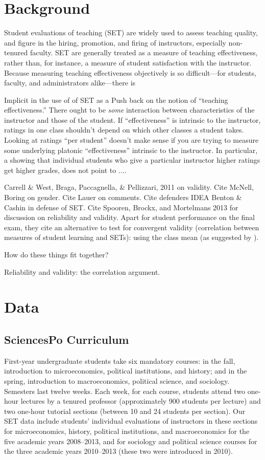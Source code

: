 \documentclass[12pt]{article}
\newcommand{\todo}[1]{{\color{red}{TO DO: \sc #1}}}
\begin{document}
\section{Background}
Student evaluations of teaching (SET) are widely used to assess teaching quality,
and figure in the hiring, promotion, and firing of instructors, especially non-tenured faculty.
SET are generally treated as a measure of teaching effectiveness, rather than, for
instance, a measure of student satisfaction with the instructor.
Because measuring teaching effectiveness objectively is so difficult---for students,
faculty, and administrators alike---there is 

Implicit in the use of of SET as a 
Push back on the notion of ``teaching effectiveness.''
There ought to be \emph{some} interaction between characteristics of the
instructor and those of the student.
If ``effectiveness'' is intrinsic to the instructor, ratings in one class shouldn't depend on
which other classes a student takes.
Looking at ratings ``per student'' doesn't make sense if you are trying to
measure some underlying platonic ``effectiveness'' intrinsic to the instructor.
In particular,  a showing that individual students who give a particular instructor higher ratings
get higher grades, does not point to ....\todo{fix me}

Carrell \& West, Braga, Paccagnella, \& Pellizzari, 2011 on validity.
Cite McNell, Boring on gender.
Cite Lauer on comments.
Cite defenders IDEA Benton \& Cashin in defense of SET.  
Cite Spooren, Brockx, and Mortelmans 2013 for discussion on reliability and validity. 
Apart for student performance on 
the final exam, they cite an alternative to test for convergent validity 
(correlation between measures of student learning 
and SETs): using the class mean (as suggested by \cite{clayson09}). 

How do these things fit together?

Reliability and validity: the correlation argument.

\section{Data}
\subsection{SciencesPo Curriculum}
First-year undergraduate students take six mandatory courses: in the fall,
introduction to microeconomics, political institutions, and history; 
and in the spring, introduction to macroeconomics, political 
science, and sociology.
Semesters last twelve weeks.
Each week, for each course, students attend two one-hour lectures by a tenured professor
(approximately 900 students per lecture) and two one-hour tutorial sections 
(between 10 and 24 students per section). 
Our SET data include students' individual evaluations of instructors 
in these sections for microeconomics, history, political institutions, and 
macroeconomics for the five academic years 2008--2013,
and for sociology and political science courses for the three academic years 2010--2013 
(these two were introduced in 2010).
\end{document}
